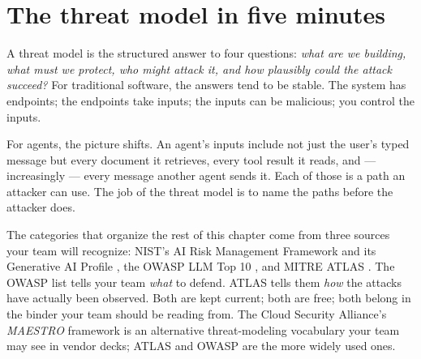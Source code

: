 \label{ch:20-hardening-06-defending}

\starttwocol

\section{The threat model in five minutes}

A threat model is the structured answer to four questions: \textit{what are we building, what must we protect, who might attack it, and how plausibly could the attack succeed?} For traditional software, the answers tend to be stable. The system has endpoints; the endpoints take inputs; the inputs can be malicious; you control the inputs.

For agents, the picture shifts. An agent's inputs include not just the user's typed message but every document it retrieves, every tool result it reads, and --- increasingly --- every message another agent sends it. Each of those is a path an attacker can use. The job of the threat model is to name the paths before the attacker does.

The categories that organize the rest of this chapter come from three sources your team will recognize: NIST's AI Risk Management Framework and its Generative AI Profile \citep{nist-airmf-100-1,nist-genai-600-1}, the OWASP LLM Top 10 \citep{owaspLLM2025}, and MITRE ATLAS \citep{mitre-atlas}. The OWASP list tells your team \textit{what} to defend. ATLAS tells them \textit{how} the attacks have actually been observed. Both are kept current; both are free; both belong in the binder your team should be reading from. The Cloud Security Alliance's \textit{MAESTRO} framework \citep{csa-maestro-2025} is an alternative threat-modeling vocabulary your team may see in vendor decks; ATLAS and OWASP are the more widely used ones.

